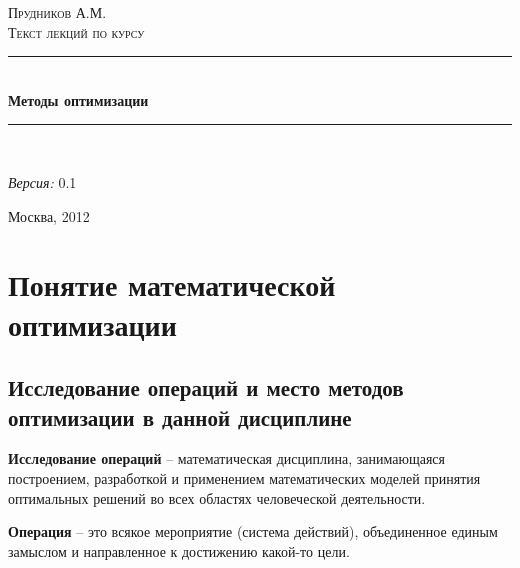 \documentclass[a4paper,12pt]{report}
\newcommand{\docTitle}{Методы оптимизации}
\newcommand{\docVersion}{0.1}
\newcommand{\HRule}{\rule{\linewidth}{0.5mm}} %
\begin{document}
\begin{titlepage}

\begin{center}

\textsc{\LARGE Прудников А.М.}\\[7.0cm]

\textsc{\Large Текст лекций по курсу}\\[0.5cm]

\HRule \\[0.4cm]
{ \huge \bfseries \docTitle}\\[0.4cm]

\HRule \\[1.5cm]

\begin{minipage}{0.8\textwidth}
\begin{flushright} \large
\emph{Версия:} \docVersion
\end{flushright}
\end{minipage}

\vfill

{\large Москва, 2012}

\end{center}

\end{titlepage}

\setcounter{page}{2}

\pagestyle{plain}

\clearpage

\tableofcontents

\clearpage

\chapter{Понятие математической оптимизации}

\section{Исследование операций и место методов оптимизации в данной дисциплине}

\textbf{Исследование операций} – математическая дисциплина, занимающаяся построением, разработкой и применением математических моделей принятия оптимальных решений во всех областях человеческой деятельности.

\textbf{Операция} – это всякое мероприятие (система действий), объединенное единым замыслом и направленное к достижению какой-то цели.
\end{document}
